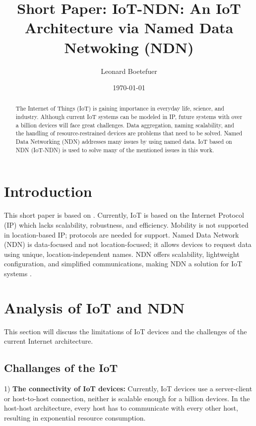 \documentclass[conference]{IEEEtran}
\title{\textbf{Short Paper:} IoT-NDN: An IoT Architecture via Named Data
Netwoking (NDN)\\}
\author{Leonard Boetefuer}
\date{\today}
\begin{document}
\maketitle

\begin{abstract}
The Internet of Things (IoT) is gaining importance in everyday life, science, and industry. Although current IoT systems can be modeled in IP, future systems with over a billion devices will face great challenges. Data aggregation, naming scalability, and the handling of resource-restrained devices are problems that need to be solved. Named Data Networking (NDN)
addresses many issues by using named data. IoT based on NDN
(IoT-NDN) is used to solve many of the mentioned issues in this work.
\end{abstract}

\section{Introduction}
This short paper is based on \cite{b99}.
Currently, IoT is based on the Internet
Protocol (IP) which lacks scalability, robustness,
and efficiency. Mobility is not supported in location-based IP; protocols are needed for support.
Named Data Network (NDN) is data-focused and not location-focused; it allows devices to request data using unique, location-independent names. NDN offers scalability, lightweight configuration, and simplified communications, making NDN a solution for IoT systems \cite{b1}.


\section{Analysis of IoT and NDN}
This section will discuss the limitations of IoT devices and the challenges of the current Internet architecture.
\subsection{Challanges of the IoT}
1) \textbf{The connectivity of IoT devices:}
Currently, IoT devices use a server-client or host-to-host connection, neither is scalable enough for a billion devices.
In the host-host architecture, every host has to communicate with every other host, resulting in exponential resource consumption.
\end{document}
